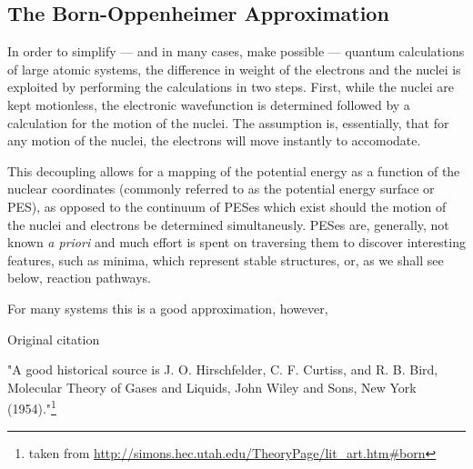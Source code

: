 \subsection{The Born-Oppenheimer Approximation}
\label{sec:born-oppenheimer}

In order to simplify --- and in many cases, make possible --- quantum calculations of large atomic systems, the difference in weight of the electrons and the nuclei is exploited by performing the calculations in two steps.
First, while the nuclei are kept motionless, the electronic wavefunction is determined followed by a calculation for the motion of the nuclei.
The assumption is, essentially, that for any motion of the nuclei, the electrons will move instantly to accomodate.


This decoupling allows for a mapping of the potential energy as a function of the nuclear coordinates (commonly referred to as the potential energy surface or PES), as opposed to the continuum of PESes which exist should the motion of the nuclei and electrons be determined simultaneusly.
PESes are, generally, not known \textit{a priori} and much effort is spent on traversing them to discover interesting features, such as minima, which represent stable structures, or, as we shall see below, reaction pathways.

For many systems this is a good approximation, however, \expand

\bit
\item Original citation~\cite{born-oppenheimer-1927}
\item "A good historical source is J. O. Hirschfelder, C. F. Curtiss, and R. B. Bird, Molecular Theory of Gases and Liquids, John Wiley and Sons, New York (1954)."\footnote{taken from \url{http://simons.hec.utah.edu/TheoryPage/lit_art.htm\#born}}
\eit
